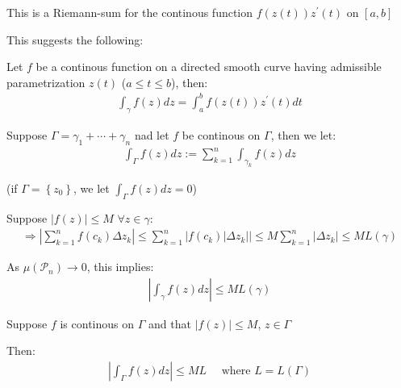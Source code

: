 \noindent This is a Riemann-sum for the continous function $f(z(t))z^{\prime}(t)$  on $[a,b]$
\par\bigskip
\noindent This suggests the following:
\par\bigskip
\begin{theo}{}
  Let $f$ be a continous function on a directed smooth curve having admissible parametrization $z(t)$ ($a\leq t\leq b$), then:
  \begin{equation*}
    \begin{gathered}
      \int_{\gamma}f(z)dz = \int_{a}^{b}f(z(t))z^{\prime}(t)dt
    \end{gathered}
  \end{equation*}
\end{theo}
\par\bigskip
\begin{theo}[]{}
  Suppose $\Gamma = \gamma_1+\cdots+\gamma_n$ nad let $f$ be continous on $\Gamma$, then we let:
  \begin{equation*}
    \begin{gathered}
      \int_{\Gamma}f(z)dz:=\sum_{k=1}^{n}\int_{\gamma_k}f(z)dz
    \end{gathered}
  \end{equation*}
  \par\bigskip
  \noindent (if $\Gamma  = \left\{z_0\right\}$, we let $\int_{\Gamma}f(z)dz = 0$)
\end{theo}
\par\bigskip
\begin{theo}[ML-inequality]{}
  Suppose $\left|f(z)\right|\leq M$ $\forall z\in\gamma$:
  \begin{equation*}
    \begin{gathered}
      \Rightarrow \left|\sum_{k=1}^{n}f(c_k)\Delta z_k\right|\leq\sum_{k=1}^{n}\left|f(c_k)\left|\Delta z_k\right|\right|\leq M\sum_{k=1}^{n}\left|\Delta z_k\right|\leq ML(\gamma)
    \end{gathered}
  \end{equation*}
  \par\bigskip
  \noindent As $\mu(\mathcal{P}_n)\to0$, this implies:
  \begin{equation*}
    \begin{gathered}
      \left|\int_{\gamma}f(z)dz\right|\leq ML(\gamma)
    \end{gathered}
  \end{equation*}
\end{theo}
\par\bigskip
\begin{theo}[]{}
  Suppose $f$ is continous on $\Gamma$ and that $\left|f(z)\right|\leq M$, $z\in\Gamma$\par
  \noindent Then:
  \begin{equation*}
    \begin{gathered}
      \left|\int_{\Gamma}f(z)dz\right|\leq ML\quad\text{ where } L = L(\Gamma)
    \end{gathered}
  \end{equation*}
\end{theo}

